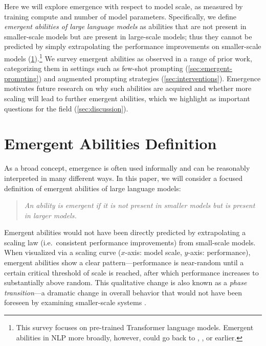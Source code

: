 \documentclass[10pt]{article} %
\begin{document}
Here we will explore emergence with respect to model scale, as measured by training compute and number of model parameters.
Specifically, we define \textit{emergent abilities of large language models} as abilities that are not present in smaller-scale models but are present in large-scale models; thus they cannot be predicted by simply extrapolating the performance improvements on smaller-scale models (\cref{sec:definition}).\footnote{This survey focuses on pre-trained Transformer language models. Emergent abilities in NLP more broadly, however, could go back to \citet{miller-etal-2004-name},  \citet{liang2005semi}, or earlier.} %
We survey emergent abilities as observed in a range of prior work, categorizing them in settings such as few-shot prompting (\cref{sec:emergent-prompting}) and augmented prompting strategies (\cref{sec:interventions}).
Emergence motivates future research on why such abilities are acquired and whether more scaling will lead to further emergent abilities, which we highlight as important questions for the field (\cref{sec:discussion}).

\section{Emergent Abilities Definition}\label{sec:definition}
As a broad concept, emergence is often used informally and can be reasonably interpreted in many different ways. 
In this paper, we will consider a focused definition of emergent abilities of large language models:

\begin{quote}
    \emph{An ability is emergent if it is not present in smaller models but is present in larger models. 
    }
\end{quote}


Emergent abilities would not have been directly predicted by extrapolating a scaling law (i.e.\ consistent performance improvements) from small-scale models.
When visualized via a scaling curve ($x$-axis: model scale, $y$-axis: performance), emergent abilities show a clear pattern---performance is near-random until a certain critical threshold of scale is reached, after which performance increases to substantially above random.
This qualitative change is also known as a \textit{phase transition}---a dramatic change in overall behavior that would not have been foreseen by examining smaller-scale systems \citep{huberman1987phase}.
\end{document}
